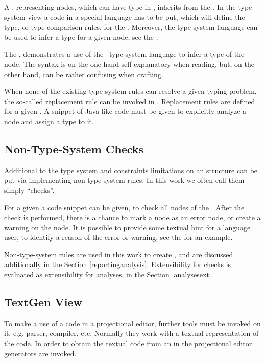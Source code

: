A , representing nodes, which can have type in \mbdr, inherits from the  . 
In the type system view a code in a special language has to be put, which will define the type, or type comparison rules, for the .
Moreover, the type system language can be used to infer a type for a given node,  see the .

The , demonstrates a use of the \jbmps\ type system language to infer a type of the  
node. The syntax is on the one hand self-explanatory when reading, but, on the other hand, can be rather confusing when crafting.

When none of the existing type system rules can resolve a given typing problem, the so-called replacement
rule can be invoked in \jbmps. Replacement rules are defined for a given . A snippet of Java-like
code must be given to explicitly analyze a node and assign a type to it.


\subsection{Non-Type-System Checks}
\label{mpsnontschecks}

Additional to the type system and constraints limitations on an  structure can be put via implementing 
non-type-system rules. In this work we often call them simply ``checks''.

For a given  a code snippet can be given, to check all nodes of the . After the 
check is performed, there is a chance to mark a node as an error node, or create a warning on the node.
It is possible to provide some textual hint for a language user, to identify a reason of the error or warning, 
see the  for an example.

Non-type-system rules are used in this work to create , and are discussed additionally in the Section 
\ref{reportinganalysis}. Extensibility for checks is evaluated as extensibility for analyses, in the Section \ref{analysesext}.

\subsection{TextGen View}

To make a use of a code in a projectional editor, further tools must be invoked on it, e.g. parser, compiler, etc.
Normally they work with a textual representation of the code. In order to obtain the textual code from an  in the projectional
editor generators are invoked. 

